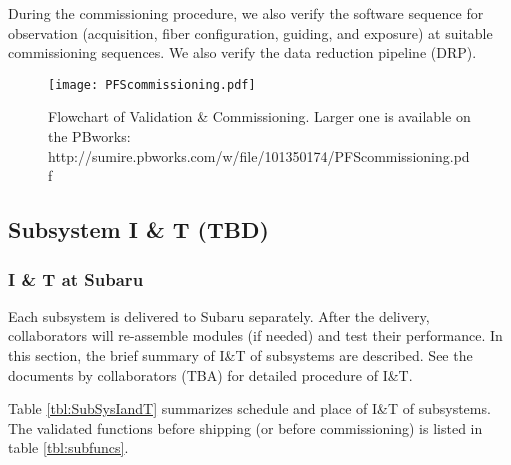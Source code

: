 During the commissioning procedure, we also verify the software sequence for observation (acquisition, fiber configuration, guiding, and exposure) at suitable commissioning sequences.
We also verify the data reduction pipeline (DRP).

\begin{landscape}
\begin{figure}[!ht]
\begin{center}
\vspace*{-10mm}
\hspace*{-5mm}
\texttt{[image: PFScommissioning.pdf]}
\end{center}
\vspace*{-8mm}
\caption{Flowchart of Validation \& Commissioning. Larger one is available on the PBworks: \newline
http://sumire.pbworks.com/w/file/101350174/PFScommissioning.pdf
}
\label{fig:flowchart}
\end{figure}
\end{landscape}

\subsection{Subsystem I \& T (TBD)}
\subsubsection{I \& T at Subaru}
Each subsystem is delivered to Subaru separately.
After the delivery, collaborators will re-assemble modules (if needed) and test their performance.
In this section, the brief summary of I\&T of subsystems are described.
See the documents by collaborators (TBA) for detailed procedure of I\&T.

Table \ref{tbl:SubSysIandT} summarizes schedule and place of I\&T of subsystems.
The validated functions before shipping (or before commissioning) is listed in table \ref{tbl:subfuncs}.

